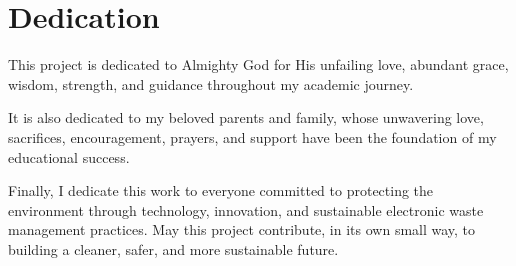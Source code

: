 \chapter*{Dedication}

\begin{center}
\begin{minipage}{0.8\textwidth}
\centering
This project is dedicated to Almighty God for His unfailing love, abundant grace,
wisdom, strength, and guidance throughout my academic journey.

\vspace{0.6cm}
It is also dedicated to my beloved parents and family, whose unwavering love,
sacrifices, encouragement, prayers, and support have been the foundation of my
educational success.

\vspace{0.6cm}
Finally, I dedicate this work to everyone committed to protecting the environment
through technology, innovation, and sustainable electronic waste management
practices. May this project contribute, in its own small way, to building a cleaner,
safer, and more sustainable future.
\end{minipage}
\end{center}
